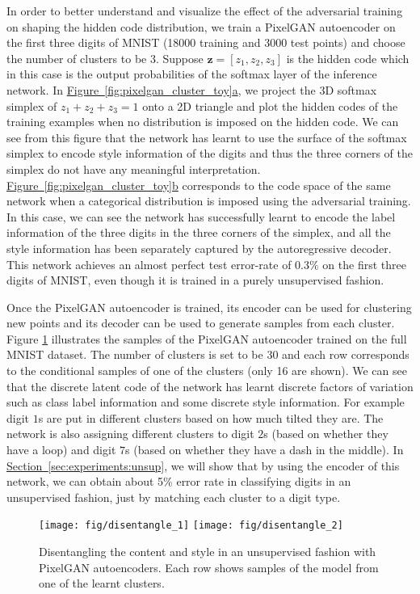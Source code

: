 \documentclass{article}
\newcommand{\mysec}[1]{\hyperref[sec:#1]{Section~\ref*{sec:#1}}}
\newcommand{\myfigg}[2]{\hyperref[fig:#1]{Figure~\ref*{fig:#1}#2}}
\begin{document}
In order to better understand and visualize the effect of the adversarial training on shaping the hidden code distribution, we train a PixelGAN autoencoder on the first three digits of MNIST (18000 training and 3000 test points) and choose the number of clusters to be 3. Suppose $\mathbf{z}=[z_1, z_2, z_3]$ is the hidden code which in this case is the output probabilities of the softmax layer of the inference network. In \myfigg{pixelgan_cluster_toy}{a}, we project the 3D softmax simplex of $z_1 + z_2 + z_3 = 1$ onto a 2D triangle and plot the hidden codes of the training examples when no distribution is imposed on the hidden code. We can see from this figure that the network has learnt to use the surface of the softmax simplex to encode style information of the digits and thus the three corners of the simplex do not have any meaningful interpretation. \myfigg{pixelgan_cluster_toy}{b} corresponds to the code space of the same network when a categorical distribution is imposed using the adversarial training. In this case, we can see the network has successfully learnt to encode the label information of the three digits in the three corners of the simplex, and all the style information has been separately captured by the autoregressive decoder. This network achieves an almost perfect test error-rate of $0.3\%$ on the first three digits of MNIST, even though it is trained in a purely unsupervised fashion.

Once the PixelGAN autoencoder is trained, its encoder can be used for clustering new points and its decoder can be used to generate samples from each cluster. Figure \ref{fig:pixelgan_cluster} illustrates the samples of the PixelGAN autoencoder trained on the full MNIST dataset. The number of clusters is set to be 30 and each row corresponds to the conditional samples of one of the clusters (only 16 are shown). We can see that the discrete latent code of the network has learnt discrete factors of variation such as class label information and some discrete style information. For example digit $1$s are put in different clusters based on how much tilted they are. The network is also assigning different clusters to digit $2$s (based on whether they have a loop) and digit $7$s (based on whether they have a dash in the middle). In \mysec{experiments:unsup}, we will show that by using the encoder of this network, we can obtain about 5\% error rate in classifying digits in an unsupervised fashion, just by matching each cluster to a digit type.


\begin{figure}[t]
\centering
\texttt{[image: fig/disentangle\_1]}
\hspace{.3cm}
\texttt{[image: fig/disentangle\_2]}
\vspace{-.1cm}
\caption{\label{fig:pixelgan_cluster}Disentangling the content and style in an unsupervised fashion with PixelGAN autoencoders. Each row shows samples of the model from one of the learnt clusters.}
\end{figure}
\end{document}
